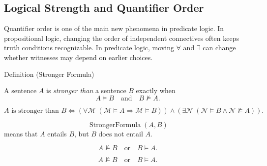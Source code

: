 
\subsection*{Logical Strength and Quantifier Order}

\begin{remark*}
Quantifier order is one of the main new phenomena in predicate logic. In
propositional logic, changing the order of independent connectives often keeps
truth conditions recognizable. In predicate logic, moving \(\forall\) and
\(\exists\) can change whether witnesses may depend on earlier choices.
\end{remark*}

\begin{definitionbox}{Definition (Stronger Formula)}
\begin{definition}
\label{def:strength}
A sentence \(A\) is \emph{stronger than} a sentence \(B\) exactly when
\[
A\models B
\quad\text{and}\quad
B\not\models A.
\]
\end{definition}
\end{definitionbox}

\begin{remark*}
\[
A \text{ is stronger than } B
\Longleftrightarrow
(\forall \mathcal M\;(\mathcal M\models A\Rightarrow\mathcal M\models B))
\land
(\exists \mathcal N\;(\mathcal N\models B\land\mathcal N\not\models A)).
\]
\end{remark*}

\begin{remark*}
\[
  \operatorname{StrongerFormula}(A,B)
\] means that \(A\) entails \(B\), but
\(B\) does not entail \(A\).
\end{remark*}

\begin{remark*}
\[
A\not\models B
\quad\text{or}\quad
B\models A.
\]
\end{remark*}

\begin{remark*}
\[
A\not\models B
\quad\text{or}\quad
B\models A.
\]
\end{remark*}

